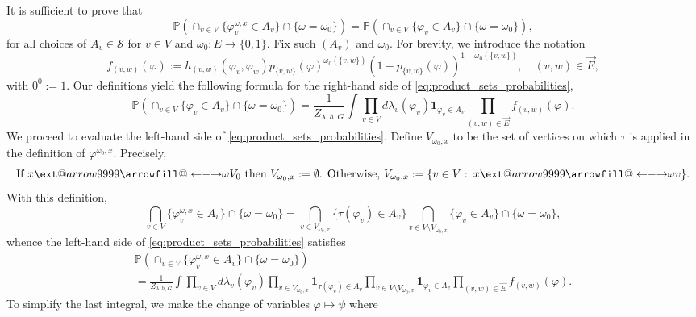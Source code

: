 \documentclass[english]{article}
\makeatletter
\renewcommand{\S}{\mathcal{S}}
\renewcommand{\P}{\mathbb{P}}
\newcommand\xleftrightarrow[2][]{%
  \ext@arrow 9999{\longleftrightarrowfill@}{#1}{#2}}
\newcommand\longleftrightarrowfill@{%
  \arrowfill@\leftarrow\relbar\rightarrow}
\newenvironment{proof}[1][\protect\proofname]{\par
\normalfont\topsep6\p@\@plus6\p@\relax
\trivlist
\itemindent\parindent
\item[\hskip\labelsep\scshape #1]\ignorespaces
}{%
\endtrivlist\@endpefalse
}
\providecommand{\proofname}{Proof}
\theoremstyle{plain}
\theoremstyle{plain}
\makeatother
\begin{document}
\begin{proof}[Proof of Lemma~\ref{lem:flip_preserves_ES_coupling}]
It is sufficient to prove that
\begin{equation}\label{eq:product_sets_probabilities}
  \P(\cap_{v\in V}\{\varphi^{\omega, x}_v\in A_v\}\cap\{\omega = \omega_0\}) = \P(\cap_{v\in V}\{\varphi_v\in A_v\}\cap\{\omega = \omega_0\}),
\end{equation}
for all choices of $A_v\in\S$ for $v\in V$ and $\omega_0:E\to\{0,1\}$. Fix such $(A_v)$ and $\omega_0$. For brevity, we introduce the notation
\[
f_{(v,w)}(\varphi):=h_{(v,w)}(\varphi_v,
\varphi_w)p_{\{v,w\}}(\varphi)^{\omega_0({\{v,w\}})}\left(1-p_{\{v,w\}}(\varphi)\right)^{1-\omega_0({\{v,w\}})},\quad (v,w)\in \vec{E},
\]
with $0^0:=1$. Our definitions yield the following formula for the right-hand side of \eqref{eq:product_sets_probabilities},
\begin{equation}\label{eq:right-hand_side_expression}
  \P(\cap_{v\in V}\{\varphi_v\in A_v\}\cap\{\omega = \omega_0\}) = \frac{1}{Z_{\lambda, h, G}}\int\prod_{v\in V} d\lambda_v(\varphi_v)\mathbf{1}_{\varphi_v\in A_v}\prod_{(v,w)\in \vec{E}} f_{(v,w)}(\varphi).
\end{equation}
We proceed to evaluate the left-hand side of \eqref{eq:product_sets_probabilities}. Define $V_{\omega_0,x}$ to be the set of vertices on which $\tau$ is applied in the definition of $\varphi^{\omega_0,x}$. Precisely,
\[
\text{If $x \xleftrightarrow{\omega} V_0$ then $V_{\omega_0,x}:=\emptyset$. Otherwise, $V_{\omega_0,x} := \{v\in V\,\colon\, x
\xleftrightarrow{\omega} v\}$}.
\]
With this definition,
\begin{equation*}
  \bigcap_{v\in V}\{\varphi^{\omega, x}_v\in A_v\}\cap\{\omega = \omega_0\} = \bigcap_{v\in V_{\omega_0,x}}\{\tau(\varphi_v)\in A_v\}\bigcap_{v\in V\setminus V_{\omega_0,x}}\{\varphi_v\in A_v\}\cap\{\omega = \omega_0\},
\end{equation*}
whence the left-hand side of \eqref{eq:product_sets_probabilities} satisfies
\begin{multline*}
  \P(\cap_{v\in V}\{\varphi^{\omega, x}_v\in A_v\}\cap\{\omega = \omega_0\})\\
  = \frac{1}{Z_{\lambda, h, G}}\int\prod_{v\in V} d\lambda_v(\varphi_v)\prod_{v\in V_{\omega_0,x}}\mathbf{1}_{\tau(\varphi_v)\in A_v}\prod_{v\in V\setminus V_{\omega_0,x}}\mathbf{1}_{\varphi_v\in A_v}\prod_{(v,w)\in \vec{E}} f_{(v,w)}(\varphi).
\end{multline*}
To simplify the last integral, we make the change of variables $\varphi\mapsto\psi$ where

\end{proof}
\end{document}
